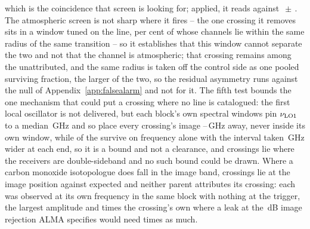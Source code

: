 which is the coincidence that screen is looking for; applied, it reads
\RfiOccMskObs{} against \RfiOccMskNull$\,\pm\,$\RfiOccMskNullSd. The
atmospheric screen is not sharp where it fires -- the one crossing it removes
sits in a window tuned on the line, \ScNearWinPct{} per cent of whose channels
lie within the same radius of the same transition -- so it establishes that
this window cannot separate the two and not that the channel is atmospheric;
that crossing remains among the \MkUnattr{} unattributed, and the same radius
is taken off the control side as one pooled surviving fraction, the larger of
the two, so the residual asymmetry runs against the null of
Appendix~\ref{app:falsealarm} and not for it. The fifth test bounds the one
mechanism that could put a crossing where no line is catalogued: the first
local oscillator is not delivered, but each block's own spectral windows pin
$\nu_{\rm LO1}$ to a median \ImLoWidthBlkGHz\,GHz and so place every
crossing's image \ImGapLoGHz--\ImGapHiGHz\,GHz away, never inside its own
window, while \ImNNoParentWide{} of the \ImNScreen{} survive on frequency
alone with the interval taken \ImWideGHz\,GHz wider at each end, so it is a
bound and not a clearance, and \ImNDsb{} crossings lie where the receivers are
double-sideband and no such bound could be drawn. Where a carbon monoxide
isotopologue does fall in the image band, \ScImNHitCross{} crossings lie at
the image position against \ScImExp{} expected and neither parent attributes
its crossing: each was observed at its own frequency in the same block with
nothing at the trigger, the largest amplitude \ScImUnRatioA{} and
\ScImUnRatioB{} times the crossing's own where a leak at the \ImIrrDb\,dB
image rejection ALMA specifies would need \ImIrrFac{} times as much.

